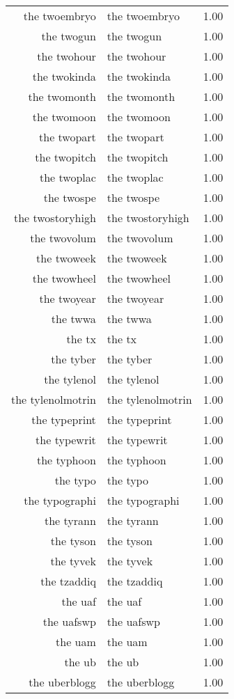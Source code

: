 \begin{table}[ht]
\begin{tabular}{rlr}
  the twoembryo & the twoembryo & 1.00 \\ 
  the twogun & the twogun & 1.00 \\ 
  the twohour & the twohour & 1.00 \\ 
  the twokinda & the twokinda & 1.00 \\ 
  the twomonth & the twomonth & 1.00 \\ 
  the twomoon & the twomoon & 1.00 \\ 
  the twopart & the twopart & 1.00 \\ 
  the twopitch & the twopitch & 1.00 \\ 
  the twoplac & the twoplac & 1.00 \\ 
  the twospe & the twospe & 1.00 \\ 
  the twostoryhigh & the twostoryhigh & 1.00 \\ 
  the twovolum & the twovolum & 1.00 \\ 
  the twoweek & the twoweek & 1.00 \\ 
  the twowheel & the twowheel & 1.00 \\ 
  the twoyear & the twoyear & 1.00 \\ 
  the twwa & the twwa & 1.00 \\ 
  the tx & the tx & 1.00 \\ 
  the tyber & the tyber & 1.00 \\ 
  the tylenol & the tylenol & 1.00 \\ 
  the tylenolmotrin & the tylenolmotrin & 1.00 \\ 
  the typeprint & the typeprint & 1.00 \\ 
  the typewrit & the typewrit & 1.00 \\ 
  the typhoon & the typhoon & 1.00 \\ 
  the typo & the typo & 1.00 \\ 
  the typographi & the typographi & 1.00 \\ 
  the tyrann & the tyrann & 1.00 \\ 
  the tyson & the tyson & 1.00 \\ 
  the tyvek & the tyvek & 1.00 \\ 
  the tzaddiq & the tzaddiq & 1.00 \\ 
  the uaf & the uaf & 1.00 \\ 
  the uafswp & the uafswp & 1.00 \\ 
  the uam & the uam & 1.00 \\ 
  the ub & the ub & 1.00 \\ 
  the uberblogg & the uberblogg & 1.00 \\ 

\end{tabular}
\end{table}
